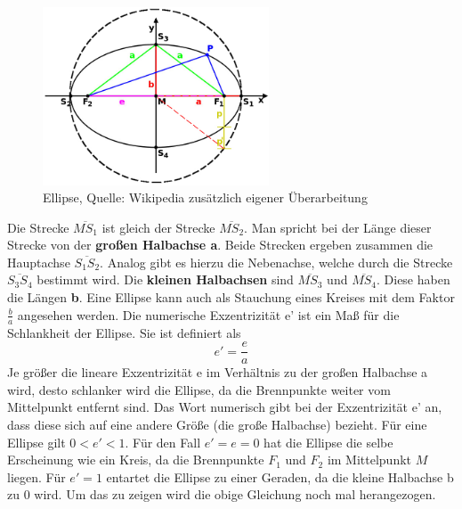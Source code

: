 \begin{figure}[h]                                                                           %
	\centering                                                                            	%
	\includegraphics[width=0.6\textwidth]{./images/ellipse_new.jpg}                         %
	\caption[Ellipse]{Ellipse, Quelle: Wikipedia zusätzlich eigener Überarbeitung}          %
	\label{fig:ellipse}                                                                     %
\end{figure}                                                                              	%
Die Strecke \ensuremath{\overline{MS_{1}}} ist gleich der Strecke \ensuremath{\overline{MS_{2}}}. Man spricht bei der Länge dieser Strecke von der \textbf{großen Halbachse a}. Beide Strecken ergeben zusammen die Hauptachse \ensuremath{\overline{S_{1}S_{2}}}. Analog gibt es hierzu die Nebenachse, welche durch die Strecke \ensuremath{\overline{S_{3}S_{4}}} bestimmt wird. Die \textbf{kleinen Halbachsen} sind \ensuremath{\overline{MS_{3}}} und \ensuremath{\overline{MS_{4}}}. Diese haben die Längen \textbf{b}. Eine Ellipse kann auch als Stauchung eines Kreises mit dem Faktor \ensuremath{\frac{b}{a}} angesehen werden. 
\newpar
Die numerische Exzentrizität e' ist ein Maß für die Schlankheit der Ellipse. Sie ist definiert als
\begin{equation}
	e'=\frac{e}{a}
\end{equation}
Je größer die lineare Exzentrizität e im Verhältnis zu der großen Halbachse a wird, desto schlanker wird die Ellipse, da die Brennpunkte weiter vom Mittelpunkt entfernt sind. Das Wort numerisch gibt bei der Exzentrizität e' an, dass diese sich auf eine andere Größe (die große Halbachse) bezieht. Für eine Ellipse gilt \ensuremath{0 < e' < 1}. Für den Fall \ensuremath{e'=e=0} hat die Ellipse die selbe Erscheinung wie ein Kreis, da die Brennpunkte \ensuremath{F_1} und \ensuremath{F_2} im Mittelpunkt \ensuremath{M} liegen. Für \ensuremath{e'=1} entartet die Ellipse zu einer Geraden, da die kleine Halbachse b zu 0 wird. Um das zu zeigen wird die obige Gleichung noch mal herangezogen.
